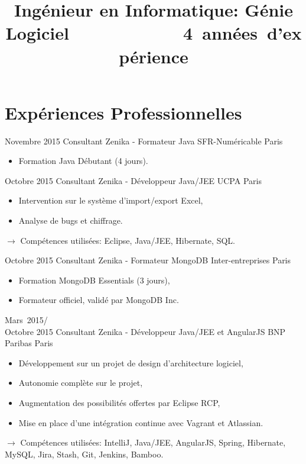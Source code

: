 \documentclass[11pt,a4paper]{moderncv}
\title{Ingénieur en Informatique: Génie Logiciel\newline\mbox{~~~~~~~~~~~~4 années d'expérience}} %
\begin{document}
\maketitle

\section{Expériences Professionnelles}

\cventry
{Novembre 2015}
{Consultant Zenika - Formateur Java}
{SFR-Numéricable}
{Paris}
{}
{\begin{itemize}
\item Formation Java Débutant (4 jours).
\end{itemize}
}   %

\cventry
{Octobre 2015}
{Consultant Zenika - Développeur Java/JEE}
{UCPA}
{Paris}
{}
{\begin{itemize}
\item Intervention sur le système d'import/export Excel, 
\item Analyse de bugs et chiffrage.
\end{itemize}
$\rightarrow$ Compétences utilisées: Eclipse, Java/JEE, Hibernate, SQL.
}   %

\cventry
{Octobre 2015}
{Consultant Zenika - Formateur MongoDB}
{Inter-entreprises}
{Paris}
{}
{\begin{itemize}
\item Formation MongoDB Essentials (3 jours),
\item Formateur officiel, validé par MongoDB Inc.
\end{itemize}
}   %

\cventry
{Mars\ 2015/\\Octobre 2015}
{Consultant Zenika - Développeur Java/JEE et AngularJS}
{BNP Paribas}
{Paris}
{}
{\begin{itemize}
\item Développement sur un projet de design d'architecture logiciel,
\item Autonomie complète sur le projet, 
\item Augmentation des possibilités offertes par Eclipse RCP,
\item Mise en place d'une intégration continue avec Vagrant et Atlassian.
\end{itemize}
$\rightarrow$ Compétences utilisées: IntelliJ, Java/JEE, AngularJS, Spring, Hibernate, MySQL, Jira, Stash, Git, Jenkins, Bamboo.
}   %
\end{document}
